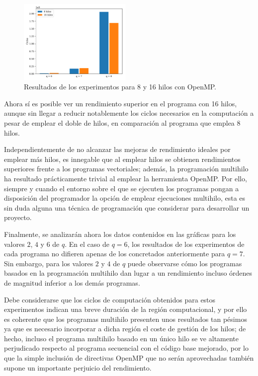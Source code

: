 \documentclass[conference]{IEEEtran}
\begin{document}
\begin{figure}[htbp]
    \centering
        \includegraphics[width=0.48\textwidth]{graficaBarrasTanda4.pdf}
        \caption{Resultados de los experimentos para 8 y 16 hilos con OpenMP.}
        \label{graficaOpenMP}
\end{figure}

Ahora sí es posible ver un rendimiento superior en el programa con 16 hilos, aunque sin llegar a reducir notablemente los ciclos necesarios en la computación a pesar de emplear el doble de hilos, en comparación al programa que emplea 8 hilos.

Independientemente de no alcanzar las mejoras de rendimiento ideales por emplear más hilos, es innegable que al emplear hilos se obtienen rendimientos superiores frente a los programas vectoriales; además, la programación multihilo ha resultado prácticamente trivial al emplear la herramienta OpenMP. Por ello, siempre y cuando el entorno sobre el que se ejecuten los programas pongan a disposición del programador la opción de emplear ejecuciones multihilo, esta es sin duda alguna una técnica de programación que considerar para desarrollar un proyecto.

Finalmente, se analizarán ahora los datos contenidos en las gráficas para los valores $2$, $4$ y $6$ de $q$. En el caso de $q = 6$, los resultados de los experimentos de cada programa no difieren apenas de los concretados anteriormente para $q = 7$. Sin embargo, para los valores $2$ y $4$ de $q$ puede observarse cómo los programas basados en la programación multihilo dan lugar a un rendimiento incluso órdenes de magnitud inferior a los demás programas.

Debe considerarse que los ciclos de computación obtenidos para estos experimentos indican una breve duración de la región computacional, y por ello es coherente que los programas multihilo presenten unos resultados tan pésimos ya que es necesario incorporar a dicha región el coste de gestión de los hilos; de hecho, incluso el programa multihilo basado en un único hilo se ve altamente perjudicado respecto al programa secuencial con el código base mejorado, por lo que la simple inclusión de directivas OpenMP que no serán aprovechadas también supone un importante perjuicio del rendimiento.
\end{document}
